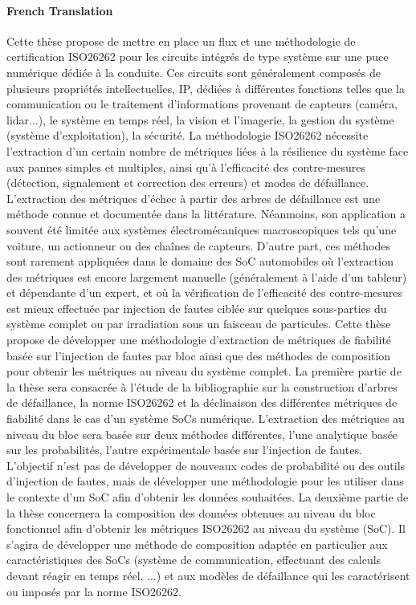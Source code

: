 \documentclass[12pt, notitlepage, twoside]{report}
\begin{document}
{\paragraph{French Translation} 
Cette thèse propose de mettre en place un flux et une méthodologie de certification ISO26262 pour les circuits intégrés de type système sur une puce numérique dédiée à la conduite. Ces circuits sont généralement composés de plusieurs propriétés intellectuelles, IP, dédiées à différentes fonctions telles que la communication ou le traitement d'informations provenant de capteurs (caméra, lidar...), le système en temps réel, la vision et l'imagerie, la gestion du système (système d'exploitation), la sécurité. La méthodologie ISO26262 nécessite l'extraction d'un certain nombre de métriques liées à la résilience du système face aux pannes simples et multiples, ainsi qu'à l'efficacité des contre-mesures (détection, signalement et correction des erreurs) et modes de défaillance. L'extraction des métriques d'échec à partir des arbres de défaillance est une méthode connue et documentée dans la littérature. Néanmoins, son application a souvent été limitée aux systèmes électromécaniques macroscopiques tels qu'une voiture, un actionneur ou des chaînes de capteurs. D'autre part, ces méthodes sont rarement appliquées dans le domaine des SoC automobiles où l'extraction des métriques est encore largement manuelle (généralement à l'aide d'un tableur) et dépendante d'un expert, et où la vérification de l'efficacité des contre-mesures est mieux effectuée par injection de fautes ciblée sur quelques sous-parties du système complet ou par irradiation sous un faisceau de particules. Cette thèse propose de développer une méthodologie d'extraction de métriques de fiabilité basée sur l'injection de fautes par bloc ainsi que des méthodes de composition pour obtenir les métriques au niveau du système complet. La première partie de la thèse sera consacrée à l'étude de la bibliographie sur la construction d'arbres de défaillance, la norme ISO26262 et la déclinaison des différentes métriques de fiabilité dans le cas d'un système SoCs numérique. L'extraction des métriques au niveau du bloc sera basée sur deux méthodes différentes, l'une analytique basée sur les probabilités, l'autre expérimentale basée sur l'injection de fautes. L'objectif n'est pas de développer de nouveaux codes de probabilité ou des outils d'injection de fautes, mais de développer une méthodologie pour les utiliser dans le contexte d'un SoC afin d'obtenir les données souhaitées. La deuxième partie de la thèse concernera la composition des données obtenues au niveau du bloc fonctionnel afin d'obtenir les métriques ISO26262 au niveau du système (SoC). Il s'agira de développer une méthode de composition adaptée en particulier aux caractéristiques des SoCs (système de communication, effectuant des calculs devant réagir en temps réel, ...) et aux modèles de défaillance qui les caractérisent ou imposés par la norme ISO26262.
}%
\end{document}
